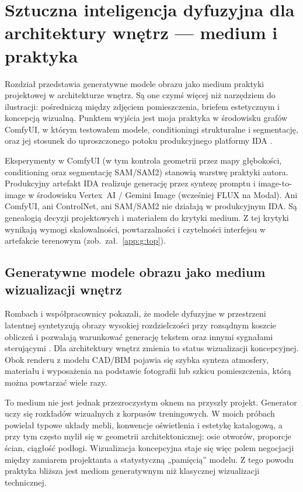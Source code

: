 \chapter{Sztuczna inteligencja dyfuzyjna dla architektury wnętrz --- medium i praktyka}
\label{ch04:top}

Rozdział przedstawia generatywne modele obrazu jako medium praktyki projektowej w architekturze wnętrz. Są one czymś więcej niż narzędziem do ilustracji: pośredniczą między zdjęciem pomieszczenia, briefem estetycznym i koncepcją wizualną.
Punktem wyjścia jest moja praktyka w środowisku grafów ComfyUI, w którym testowałem modele, conditioningi strukturalne i segmentację, oraz jej stosunek do uproszczonego potoku produkcyjnego platformy IDA \parencite{idaPlatform2026}.

Eksperymenty w ComfyUI (w tym kontrola geometrii przez mapy głębokości, conditioning oraz segmentację SAM/SAM2) stanowią warstwę praktyki autora. Produkcyjny artefakt IDA realizuje generację przez syntezę promptu i image-to-image w środowisku Vertex~AI / Gemini Image (wcześniej FLUX na Modal).
Ani ComfyUI, ani ControlNet, ani SAM/SAM2 nie działają w produkcyjnym IDA. Są genealogią decyzji projektowych i materiałem do krytyki medium. Z tej krytyki wynikają wymogi skalowalności, powtarzalności i czytelności interfejsu w artefakcie terenowym (zob.\ zał.~\ref{app:g:top}).

\section{Generatywne modele obrazu jako medium wizualizacji wnętrz}
\label{ch04:sec:genai-medium}

Rombach i współpracownicy pokazali, że modele dyfuzyjne w przestrzeni latentnej syntetyzują obrazy wysokiej rozdzielczości przy rozsądnym koszcie obliczeń i pozwalają warunkować generację tekstem oraz innymi sygnałami sterującymi \parencite{rombach2022ldm}.
Dla architektury wnętrz zmienia to status wizualizacji koncepcyjnej. Obok renderu z modelu CAD/BIM pojawia się szybka synteza atmosfery, materiału i wyposażenia na podstawie fotografii lub szkicu pomieszczenia, którą można powtarzać wiele razy.

To medium nie jest jednak przezroczystym oknem na przyszły projekt. Generator uczy się rozkładów wizualnych z korpusów treningowych.
W moich próbach powielał typowe układy mebli, konwencje oświetlenia i estetykę katalogową, a przy tym często mylił się w geometrii architektonicznej: osie otworów, proporcje ścian, ciągłość podłogi.
Wizualizacja koncepcyjna staje się więc polem negocjacji między zamiarem projektanta a statystyczną „pamięcią” modelu. Z tego powodu praktyka bliższa jest mediom generatywnym niż klasycznej wizualizacji technicznej.

